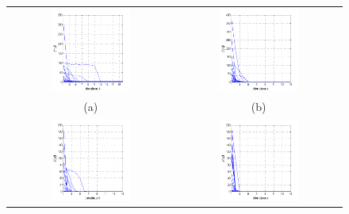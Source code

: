 \begin{figure}[t]
\label{fig:convergence}
\centering
\begin{tabular}{cc}
 \includegraphics[width=0.5\textwidth,height =0.4\textheight]{figures/ccp/convergence_m4}
&
  \includegraphics[width=0.5\textwidth,height =0.4\textheight]{figures/ccp/convergence_m5} 
  \\   (a) & (b)    \\
 \includegraphics[width=0.5\textwidth,height =0.4\textheight]{figures/ccp/convergence_m7}    
 &
  \includegraphics[width=0.5\textwidth,height =0.4\textheight]{figures/ccp/convergence_m10} 

\end{tabular}
\end{figure}
